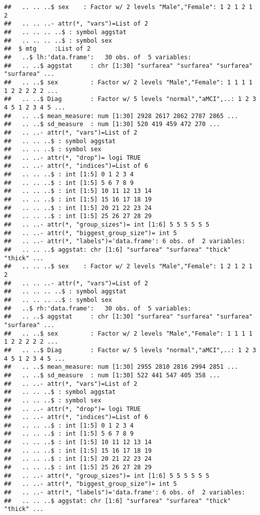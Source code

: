 \documentclass[12pt]{article}
\begin{document}
\begin{knitrout}
\begin{kframe}
\begin{verbatim}
##   .. .. ..$ sex    : Factor w/ 2 levels "Male","Female": 1 2 1 2 1 2
##   .. .. ..- attr(*, "vars")=List of 2
##   .. .. .. ..$ : symbol aggstat
##   .. .. .. ..$ : symbol sex
##  $ mtg     :List of 2
##   ..$ lh:'data.frame':	30 obs. of  5 variables:
##   .. ..$ aggstat     : chr [1:30] "surfarea" "surfarea" "surfarea" "surfarea" ...
##   .. ..$ sex         : Factor w/ 2 levels "Male","Female": 1 1 1 1 1 2 2 2 2 2 ...
##   .. ..$ Diag        : Factor w/ 5 levels "normal","aMCI",..: 1 2 3 4 5 1 2 3 4 5 ...
##   .. ..$ mean_measure: num [1:30] 2928 2617 2862 2787 2865 ...
##   .. ..$ sd_measure  : num [1:30] 520 419 459 472 270 ...
##   .. ..- attr(*, "vars")=List of 2
##   .. .. ..$ : symbol aggstat
##   .. .. ..$ : symbol sex
##   .. ..- attr(*, "drop")= logi TRUE
##   .. ..- attr(*, "indices")=List of 6
##   .. .. ..$ : int [1:5] 0 1 2 3 4
##   .. .. ..$ : int [1:5] 5 6 7 8 9
##   .. .. ..$ : int [1:5] 10 11 12 13 14
##   .. .. ..$ : int [1:5] 15 16 17 18 19
##   .. .. ..$ : int [1:5] 20 21 22 23 24
##   .. .. ..$ : int [1:5] 25 26 27 28 29
##   .. ..- attr(*, "group_sizes")= int [1:6] 5 5 5 5 5 5
##   .. ..- attr(*, "biggest_group_size")= int 5
##   .. ..- attr(*, "labels")='data.frame':	6 obs. of  2 variables:
##   .. .. ..$ aggstat: chr [1:6] "surfarea" "surfarea" "thick" "thick" ...
##   .. .. ..$ sex    : Factor w/ 2 levels "Male","Female": 1 2 1 2 1 2
##   .. .. ..- attr(*, "vars")=List of 2
##   .. .. .. ..$ : symbol aggstat
##   .. .. .. ..$ : symbol sex
##   ..$ rh:'data.frame':	30 obs. of  5 variables:
##   .. ..$ aggstat     : chr [1:30] "surfarea" "surfarea" "surfarea" "surfarea" ...
##   .. ..$ sex         : Factor w/ 2 levels "Male","Female": 1 1 1 1 1 2 2 2 2 2 ...
##   .. ..$ Diag        : Factor w/ 5 levels "normal","aMCI",..: 1 2 3 4 5 1 2 3 4 5 ...
##   .. ..$ mean_measure: num [1:30] 2955 2810 2816 2994 2851 ...
##   .. ..$ sd_measure  : num [1:30] 522 441 547 405 358 ...
##   .. ..- attr(*, "vars")=List of 2
##   .. .. ..$ : symbol aggstat
##   .. .. ..$ : symbol sex
##   .. ..- attr(*, "drop")= logi TRUE
##   .. ..- attr(*, "indices")=List of 6
##   .. .. ..$ : int [1:5] 0 1 2 3 4
##   .. .. ..$ : int [1:5] 5 6 7 8 9
##   .. .. ..$ : int [1:5] 10 11 12 13 14
##   .. .. ..$ : int [1:5] 15 16 17 18 19
##   .. .. ..$ : int [1:5] 20 21 22 23 24
##   .. .. ..$ : int [1:5] 25 26 27 28 29
##   .. ..- attr(*, "group_sizes")= int [1:6] 5 5 5 5 5 5
##   .. ..- attr(*, "biggest_group_size")= int 5
##   .. ..- attr(*, "labels")='data.frame':	6 obs. of  2 variables:
##   .. .. ..$ aggstat: chr [1:6] "surfarea" "surfarea" "thick" "thick" ...

\end{verbatim}
\end{kframe}
\end{knitrout}
\end{document}
